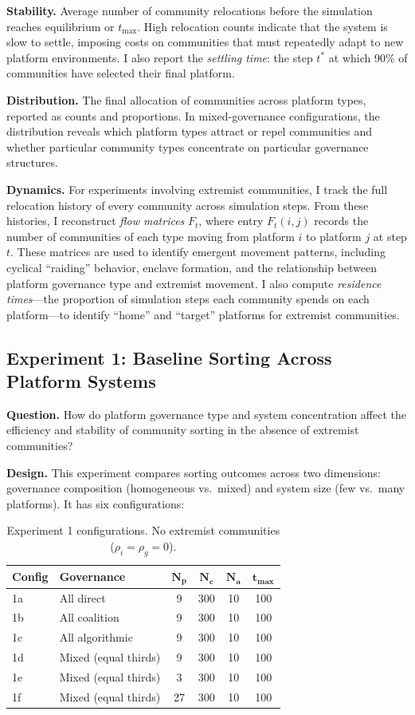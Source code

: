 \documentclass{article}
\begin{document}
\textbf{Stability.} Average number of community relocations before the simulation reaches equilibrium or $t_{\max}$. High relocation counts indicate that the system is slow to settle, imposing costs on communities that must repeatedly adapt to new platform environments. I also report the \textit{settling time}: the step $t^*$ at which 90\% of communities have selected their final platform.

\textbf{Distribution.} The final allocation of communities across platform types, reported as counts and proportions. In mixed-governance configurations, the distribution reveals which platform types attract or repel communities and whether particular community types concentrate on particular governance structures.

\textbf{Dynamics.} For experiments involving extremist communities, I track the full relocation history of every community across simulation steps. From these histories, I reconstruct \textit{flow matrices} $F_t$, where entry $F_t(i,j)$ records the number of communities of each type moving from platform $i$ to platform $j$ at step $t$. These matrices are used to identify emergent movement patterns, including cyclical ``raiding'' behavior, enclave formation, and the relationship between platform governance type and extremist movement. I also compute \textit{residence times}---the proportion of simulation steps each community spends on each platform---to identify ``home'' and ``target'' platforms for extremist communities.

\subsection{Experiment 1: Baseline Sorting Across Platform Systems}
\label{sec:exp1}

\textbf{Question.} How do platform governance type and system concentration affect the efficiency and stability of community sorting in the absence of extremist communities?

\textbf{Design.} This experiment compares sorting outcomes across two dimensions: governance composition (homogeneous vs.\ mixed) and system size (few vs.\ many platforms). It has six configurations:

\begin{table}[h]
\centering
\begin{tabular}{llcccc}
\hline
\textbf{Config} & \textbf{Governance} & $\mathbf{N_p}$ & $\mathbf{N_c}$ & $\mathbf{N_a}$ & $\mathbf{t_{max}}$ \\
\hline \hline
1a & All direct & 9 & 300 & 10 & 100 \\
1b & All coalition & 9 & 300 & 10 & 100 \\
1c & All algorithmic & 9 & 300 & 10 & 100 \\
1d & Mixed (equal thirds) & 9 & 300 & 10 & 100 \\
1e & Mixed (equal thirds) & 3 & 300 & 10 & 100 \\
1f & Mixed (equal thirds) & 27 & 300 & 10 & 100 \\
\hline
\end{tabular}
\caption{Experiment 1 configurations. No extremist communities ($\rho_i = \rho_g = 0$).}
\label{tab:exp1_config}
\end{table}
\end{document}
